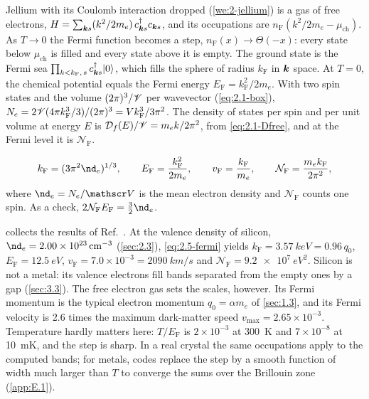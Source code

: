 Jellium with its Coulomb interaction dropped (\cref{we:2-jellium}) is a gas of free electrons, $H = \sum_{\bm{k}s}(k^2/2m_e)\,c^\dagger_{\bm{k}s}c_{\bm{k}s}$, and its occupations are $n_{\mathrm{F}}(k^2/2m_e - \mu_{\mathrm{ch}})$. As $T \to 0$ the Fermi function becomes a step, $n_{\mathrm{F}}(x) \to \Theta(-x)$: every state below $\mu_{\mathrm{ch}}$ is filled and every state above it is empty. The ground state is the Fermi sea $\prod_{k < k_{\mathrm{F}},\,s}c^\dagger_{\bm{k}s}|0\rangle$, which fills the sphere of radius $k_{\mathrm{F}}$ in $\bm{k}$ space. At $T = 0$, the chemical potential equals the Fermi energy $E_{\mathrm{F}} = k_{\mathrm{F}}^2/2m_e$. With two spin states and the volume $(2\pi)^3/\mathscr{V}$ per wavevector (\cref{eq:2.1-box}), $N_e = 2\mathscr{V}(4\pi k_{\mathrm{F}}^3/3)/(2\pi)^3 = Vk_{\mathrm{F}}^3/3\pi^2$. The density of states per spin and per unit volume at energy $E$ is $\mathcal{D}_f(E)/\mathscr{V} = m_ek/2\pi^2$, from \cref{eq:2.1-Dfree}, and at the Fermi level it is $\mathcal{N}_{\mathrm{F}}$.
\begin{keyresult}[Free electron gas at $T = 0$]
\begin{equation}
  k_{\mathrm{F}} = (3\pi^2\nd_e)^{1/3}, \qquad E_{\mathrm{F}} = \frac{k_{\mathrm{F}}^2}{2m_e}, \qquad v_{\mathrm{F}} = \frac{k_{\mathrm{F}}}{m_e}, \qquad \mathcal{N}_{\mathrm{F}} = \frac{m_ek_{\mathrm{F}}}{2\pi^2} ,
  \label{eq:2.5-fermi}
\end{equation}
where $\nd_e = N_e/\Vol$ is the mean electron density and $\mathcal{N}_{\mathrm{F}}$ counts one spin. As a check, $2\mathcal{N}_{\mathrm{F}}E_{\mathrm{F}} = \tfrac32\nd_e$.
\end{keyresult}
 collects the results of Ref.~\cite[Chap.~2]{ashcroft1976solid}. At the valence density of silicon, $\nd_e = \SI{2.00e23}{cm^{-3}}$ (\cref{sec:2.3}), \cref{eq:2.5-fermi} yields $k_{\mathrm{F}} = \SI{3.57}{keV} = 0.96\,q_0$, $E_{\mathrm{F}} = \SI{12.5}{eV}$, $v_{\mathrm{F}} = 7.0\times10^{-3} = \SI{2090}{km/s}$ and $\mathcal{N}_{\mathrm{F}} = \SI{9.2e7}{eV^2}$. Silicon is not a metal: its valence electrons fill bands separated from the empty ones by a gap (\cref{sec:3.3}). The free electron gas sets the scales, however. Its Fermi momentum is the typical electron momentum $q_0 = \alpha m_e$ of \cref{sec:1.3}, and its Fermi velocity is 2.6 times the maximum dark-matter speed $v_{\mathrm{max}} = 2.65\times10^{-3}$. Temperature hardly matters here: $T/E_{\mathrm{F}}$ is $2\times10^{-3}$ at \SI{300}{K} and $7\times10^{-8}$ at \SI{10}{mK}, and the step is sharp. In a real crystal the same occupations apply to the computed bands; for metals, codes replace the step by a smooth function of width much larger than $T$ to converge the sums over the Brillouin zone (\cref{app:E.1}).

